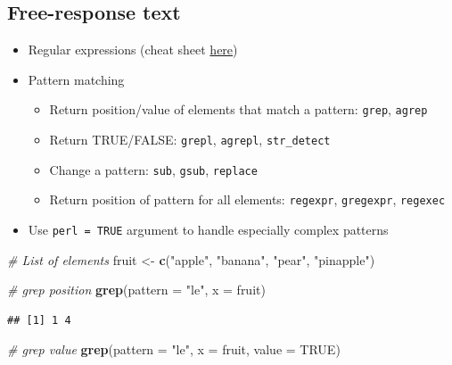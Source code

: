 \documentclass[
]{book}
\newenvironment{Shaded}{\begin{snugshade}}{\end{snugshade}}
\newcommand{\CommentTok}[1]{\textcolor[rgb]{0.56,0.35,0.01}{\textit{#1}}}
\newcommand{\DataTypeTok}[1]{\textcolor[rgb]{0.13,0.29,0.53}{#1}}
\newcommand{\KeywordTok}[1]{\textcolor[rgb]{0.13,0.29,0.53}{\textbf{#1}}}
\newcommand{\NormalTok}[1]{#1}
\newcommand{\OtherTok}[1]{\textcolor[rgb]{0.56,0.35,0.01}{#1}}
\newcommand{\StringTok}[1]{\textcolor[rgb]{0.31,0.60,0.02}{#1}}
\providecommand{\tightlist}{%
  \setlength{\itemsep}{0pt}\setlength{\parskip}{0pt}}
\begin{document}
\hypertarget{free-response-text}{%
\subsection{Free-response text}\label{free-response-text}}

\begin{itemize}
\tightlist
\item
  Regular expressions (cheat sheet \href{https://rstudio.com/wp-content/uploads/2016/09/RegExCheatsheet.pdf}{here})
\item
  Pattern matching

  \begin{itemize}
  \tightlist
  \item
    Return position/value of elements that match a pattern: \texttt{grep}, \texttt{agrep}
  \item
    Return TRUE/FALSE: \texttt{grepl}, \texttt{agrepl}, \texttt{str\_detect}
  \item
    Change a pattern: \texttt{sub}, \texttt{gsub}, \texttt{replace}
  \item
    Return position of pattern for all elements: \texttt{regexpr}, \texttt{gregexpr}, \texttt{regexec}
  \end{itemize}
\item
  Use \texttt{perl\ =\ TRUE} argument to handle especially complex patterns
\end{itemize}

\begin{Shaded}
\begin{Highlighting}[]
\CommentTok{# List of elements}
\NormalTok{fruit <-}\StringTok{ }\KeywordTok{c}\NormalTok{(}\StringTok{"apple"}\NormalTok{, }\StringTok{"banana"}\NormalTok{, }\StringTok{"pear"}\NormalTok{, }\StringTok{"pinapple"}\NormalTok{)}

\CommentTok{# grep position}
\KeywordTok{grep}\NormalTok{(}\DataTypeTok{pattern =} \StringTok{"le"}\NormalTok{, }\DataTypeTok{x =}\NormalTok{ fruit)}
\end{Highlighting}
\end{Shaded}

\begin{verbatim}
## [1] 1 4
\end{verbatim}

\begin{Shaded}
\begin{Highlighting}[]
\CommentTok{# grep value}
\KeywordTok{grep}\NormalTok{(}\DataTypeTok{pattern =} \StringTok{"le"}\NormalTok{, }\DataTypeTok{x =}\NormalTok{ fruit, }\DataTypeTok{value =} \OtherTok{TRUE}\NormalTok{)}
\end{Highlighting}
\end{Shaded}
\end{document}
